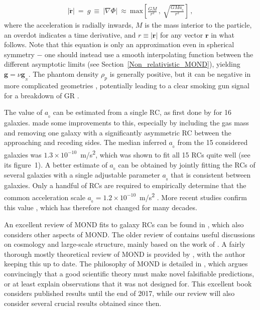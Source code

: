\documentclass[fleqn,usenatbib,useAMS]{mnras} %
\begin{document}
\begin{eqnarray}
	\left| \ddot{\bm{r}} \right| ~=~ g ~\equiv~ \left| \nabla \Phi \right| ~\approx~ \mathrm{max} \left[ \frac{GM}{r^2}\, , ~\sqrt{\frac{GMa_{_0}}{r^2}} \right] \, ,
	\label{Deep_MOND_limit}
\end{eqnarray}
where the acceleration is radially inwards, $M$ is the mass interior to the particle, an overdot indicates a time derivative, and $r \equiv \left| \bm{r} \right|$ for any vector $\bm{r}$ in what follows. Note that this equation is only an approximation even in spherical symmetry $-$ one should instead use a smooth interpolating function between the different asymptotic limits (see Section~\ref{Non_relativistic_MOND}), yielding $\bm{g} = \nu \bm{g}_{_N}$. The phantom density $\rho_p$ is generally positive, but it can be negative in more complicated geometries \citep{Milgrom_1986_negative, Banik_2018_EFE}, potentially leading to a clear smoking gun signal for a breakdown of GR \citep{Oria_2021}.

The value of $a_{_0}$ can be estimated from a single RC, as first done by \citet{Kent_1987} for 16 galaxies. \citet{Milgrom_1988_a0} made some improvements to this, especially by including the gas mass and removing one galaxy with a significantly asymmetric RC between the approaching and receding sides. The median inferred $a_{_0}$ from the 15 considered galaxies was $1.3 \times 10^{-10}$~m/s\textsuperscript{2}, which was shown to fit all 15 RCs quite well (see its figure~1). A better estimate of $a_{_0}$ can be obtained by jointly fitting the RCs of several galaxies with a single adjustable parameter $a_{_0}$ that is consistent between galaxies. Only a handful of RCs are required to empirically determine that the common acceleration scale $a_{_0} = 1.2 \times 10^{-10}$~m/s\textsuperscript{2} \citep{Begeman_1991}. More recent studies confirm this value \citep{Gentile_2011, McGaugh_Lelli_2016}, which has therefore not changed for many decades.

An excellent review of MOND fits to galaxy RCs can be found in \citet{Famaey_McGaugh_2012}, which also considers other aspects of MOND. The older review of \citet{Sanders_2002} contains useful discussions on cosmology and large-scale structure, mainly based on the work of \citet{Sanders_2001}. A fairly thorough mostly theoretical review of MOND is provided by \citet{Milgrom_2014_Scholarpedia}, with the author keeping this up to date. The philosophy of MOND is detailed in \citet{Merritt_2020}, which argues convincingly that a good scientific theory must make novel falsifiable predictions, or at least explain observations that it was not designed for. This excellent book considers published results until the end of 2017, while our review will also consider several crucial results obtained since then.
\end{document}
